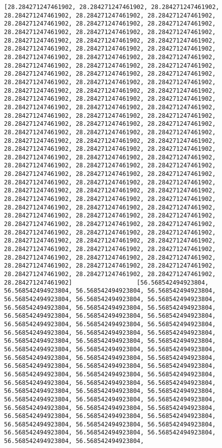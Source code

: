 \documentclass[11pt]{article}
\begin{document}
    \begin{Verbatim}[commandchars=\\\{\}]
[28.284271247461902, 28.284271247461902, 28.284271247461902, 28.284271247461902, 28.284271247461902, 28.284271247461902, 28.284271247461902, 28.284271247461902, 28.284271247461902, 28.284271247461902, 28.284271247461902, 28.284271247461902, 28.284271247461902, 28.284271247461902, 28.284271247461902, 28.284271247461902, 28.284271247461902, 28.284271247461902, 28.284271247461902, 28.284271247461902, 28.284271247461902, 28.284271247461902, 28.284271247461902, 28.284271247461902, 28.284271247461902, 28.284271247461902, 28.284271247461902, 28.284271247461902, 28.284271247461902, 28.284271247461902, 28.284271247461902, 28.284271247461902, 28.284271247461902, 28.284271247461902, 28.284271247461902, 28.284271247461902, 28.284271247461902, 28.284271247461902, 28.284271247461902, 28.284271247461902, 28.284271247461902, 28.284271247461902, 28.284271247461902, 28.284271247461902, 28.284271247461902, 28.284271247461902, 28.284271247461902, 28.284271247461902, 28.284271247461902, 28.284271247461902, 28.284271247461902, 28.284271247461902, 28.284271247461902, 28.284271247461902, 28.284271247461902, 28.284271247461902, 28.284271247461902, 28.284271247461902, 28.284271247461902, 28.284271247461902, 28.284271247461902, 28.284271247461902, 28.284271247461902, 28.284271247461902, 28.284271247461902, 28.284271247461902, 28.284271247461902, 28.284271247461902, 28.284271247461902, 28.284271247461902, 28.284271247461902, 28.284271247461902, 28.284271247461902, 28.284271247461902, 28.284271247461902, 28.284271247461902, 28.284271247461902, 28.284271247461902, 28.284271247461902, 28.284271247461902, 28.284271247461902, 28.284271247461902, 28.284271247461902, 28.284271247461902, 28.284271247461902, 28.284271247461902, 28.284271247461902, 28.284271247461902, 28.284271247461902, 28.284271247461902, 28.284271247461902, 28.284271247461902, 28.284271247461902, 28.284271247461902, 28.284271247461902, 28.284271247461902, 28.284271247461902, 28.284271247461902, 28.284271247461902, 28.284271247461902]                  [56.568542494923804, 56.568542494923804, 56.568542494923804, 56.568542494923804, 56.568542494923804, 56.568542494923804, 56.568542494923804, 56.568542494923804, 56.568542494923804, 56.568542494923804, 56.568542494923804, 56.568542494923804, 56.568542494923804, 56.568542494923804, 56.568542494923804, 56.568542494923804, 56.568542494923804, 56.568542494923804, 56.568542494923804, 56.568542494923804, 56.568542494923804, 56.568542494923804, 56.568542494923804, 56.568542494923804, 56.568542494923804, 56.568542494923804, 56.568542494923804, 56.568542494923804, 56.568542494923804, 56.568542494923804, 56.568542494923804, 56.568542494923804, 56.568542494923804, 56.568542494923804, 56.568542494923804, 56.568542494923804, 56.568542494923804, 56.568542494923804, 56.568542494923804, 56.568542494923804, 56.568542494923804, 56.568542494923804, 56.568542494923804, 56.568542494923804, 56.568542494923804, 56.568542494923804, 56.568542494923804, 56.568542494923804, 56.568542494923804, 56.568542494923804, 56.568542494923804, 56.568542494923804, 56.568542494923804, 56.568542494923804, 56.568542494923804, 56.568542494923804, 56.568542494923804, 
\end{Verbatim}
\end{document}
